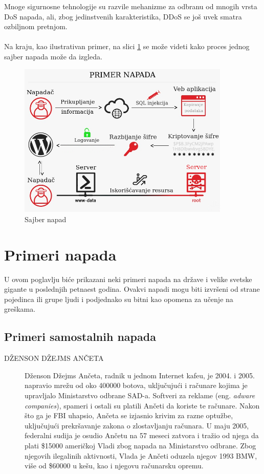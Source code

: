 \documentclass[a4paper]{article}
\theoremstyle{break}
\begin{document}
{Mnoge sigurnosne tehnologije su razvile mehanizme za odbranu od mnogih vrsta DoS napada, ali, zbog jedinstvenih karakteristika, DDoS se još uvek smatra ozbiljnom pretnjom.\\\\

Na kraju, kao ilustrativan primer, na slici \ref{fig:primer_napada} se može videti kako proces jednog sajber napada može da izgleda. 

\begin{figure}[h!]
\begin{center}
\includegraphics[height=0.37\textwidth, width=0.9\textwidth]{napad.png}
\end{center}
\caption{Sajber napad}
\label{fig:primer_napada}
\end{figure}

\section{Primeri napada}
\label{sec:primeri_napada}

U ovom poglavlju biće prikazani neki primeri napada na države i velike svetske gigante u poslednjih petnaest godina. Ovakvi napadi mogu biti izvršeni od strane pojedinca ili grupe ljudi i podjednako su bitni kao opomena za učenje na greškama. 

\subsection{Primeri samostalnih napada}
\label{subsec:primeri_samo_napada}

\begin{description}
\item[DŽENSON DŽEJMS ANČETA] Dženson Džejms Ančeta, radnik u jednom Internet kafeu, je 2004. i 2005. napravio mrežu od oko 400000 botova, uključujući i računare kojima je upravljalo Ministarstvo odbrane SAD-a. Softveri za reklame (eng. {\em adware companies}), spameri i ostali su platili Ančeti da koriste te računare. Nakon što ga je FBI uhapsio, Ančeta se izjasnio krivim za razne optužbe, uključujući prekršavanje zakona o zlostavljanju računara. U maju 2005, federalni sudija je osudio Ančetu na 57 meseci zatvora i tražio od njega da plati \$15000 američkoj Vladi zbog napada na Ministarstvo odbrane. Zbog njegovih ilegalinih aktivnosti, Vlada je Ančeti oduzela njegov 1993 BMW, više od \$60000 u kešu, kao i njegovu računarsku opremu.



\end{description}}
\end{document}

